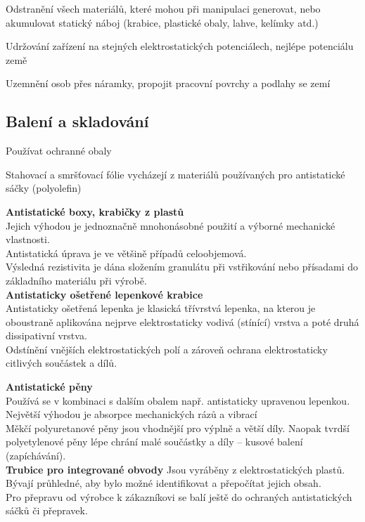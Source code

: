 Odstranění všech materiálů, které mohou při manipulaci generovat, nebo akumulovat
statický náboj (krabice, plastické obaly, lahve, kelímky atd.)

Udržování zařízení na stejných elektrostatických potenciálech, nejlépe potenciálu
země

Uzemnění osob přes náramky, propojit pracovní povrchy a podlahy se zemí



\subsection{Balení a skladování}
Používat ochranné obaly

Stahovací a smršťovací fólie vycházejí z materiálů používaných pro antistatické sáčky (polyolefin)

\textbf{Antistatické boxy, krabičky z plastů}\\
Jejich výhodou je jednoznačně mnohonásobné použití a výborné mechanické
vlastnosti.\\
Antistatická úprava je ve většině případů celoobjemová.\\
Výsledná rezistivita je dána složením granulátu při vstřikování nebo přísadami do
základního materiálu při výrobě.\\

\textbf{Antistaticky ošetřené lepenkové krabice}\\
Antistaticky ošetřená lepenka je klasická třívrstvá lepenka, na kterou je oboustraně
aplikována nejprve elektrostaticky vodivá (stínící) vrstva a poté druhá dissipativní vrstva.\\
Odstínění vnějších elektrostatických polí a zároveň ochrana elektrostaticky citlivých součástek a dílů.

\textbf{Antistatické pěny}\\
Používá se v kombinaci s dalším obalem např. antistaticky upravenou lepenkou.\\
Největší výhodou je absorpce mechanických rázů a vibrací\\
Měkčí polyuretanové pěny jsou vhodnější pro výplně a větší díly. Naopak tvrdší polyetylenové pěny lépe chrání malé součástky a díly – kusové balení (zapíchávání).\\

\textbf{Trubice pro integrované obvody}
Jsou vyráběny z elektrostatických plastů.\\
Bývají průhledné, aby bylo možné identifikovat a přepočítat jejich obsah.\\
Pro přepravu od výrobce k zákazníkovi se balí ještě do ochraných antistatických
sáčků či přepravek.\\

